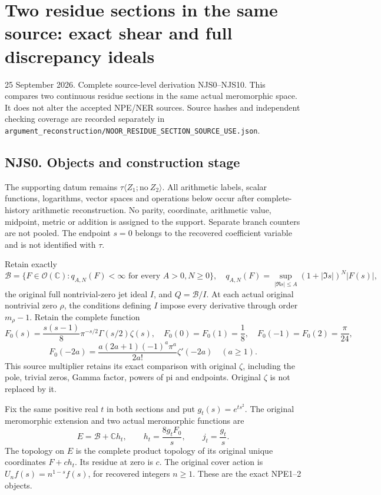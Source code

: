 \section{Two residue sections in the same source: exact shear and full
discrepancy
ideals}\label{two-residue-sections-in-the-same-source-exact-shear-and-full-discrepancy-ideals}

25 September 2026. Complete source-level derivation NJS0--NJS10. This
compares two continuous residue sections in the same actual meromorphic
space. It does not alter the accepted NPE/NER sources. Source hashes and
independent checking coverage are recorded separately in
\nolinkurl{argument_reconstruction/NOOR_RESIDUE_SECTION_SOURCE_USE.json}.

\subsection{NJS0. Objects and construction
stage}\label{njs0.-objects-and-construction-stage}

The supporting datum remains
\(\tau\langle Z_1;\mathrm{no}\ Z_2\rangle\). All arithmetic labels,
scalar functions, logarithms, vector spaces and operations below occur
after complete-history arithmetic reconstruction. No parity, coordinate,
arithmetic value, midpoint, metric or addition is assigned to the
support. Separate branch counters are not pooled. The endpoint \(s=0\)
belongs to the recovered coefficient variable and is not identified with
\(\tau\).

Retain exactly \[
\mathcal B=\{F\in\mathcal O(\mathbb C):q_{A,N}(F)<\infty\text{ for every }A>0,N\ge0\},
\quad q_{A,N}(F)=\sup_{|\Re s|\le A}(1+|\Im s|)^N|F(s)|,
\tag{NJS0.1}
\] the original full nontrivial-zero jet ideal \(I\), and
\(Q=\mathcal B/I\). At each actual original nontrivial zero \(\rho\),
the conditions defining \(I\) impose every derivative through order
\(m_\rho-1\). Retain the complete function \[
F_0(s)=\frac{s(s-1)}8\pi^{-s/2}\Gamma(s/2)\zeta(s),
\quad F_0(0)=F_0(1)=\frac18,
\quad F_0(-1)=F_0(2)=\frac\pi{24},
\] \[
F_0(-2a)=\frac{a(2a+1)(-1)^a\pi^a}{2a!}\zeta'(-2a)\quad(a\ge1).
\tag{NJS0.2}
\] This source multiplier retains its exact comparison with original
\(\zeta\), including the pole, trivial zeros, Gamma factor, powers of pi
and endpoints. Original \(\zeta\) is not replaced by it.

Fix the same positive real \(t\) in both sections and put
\(g_t(s)=e^{ts^2}\). The original meromorphic extension and two actual
meromorphic functions are \[
E=\mathcal B+\mathbb C h_t,
\qquad h_t=\frac{8g_tF_0}s,
\qquad j_t=\frac{g_t}s.
\tag{NJS0.3}
\] The topology on \(E\) is the complete product topology of its
original unique coordinates \(F+ch_t\). Its residue at zero is \(c\).
The original cover action is \(U_nf(s)=n^{1-s}f(s)\), for recovered
integers \(n\ge1\). These are the exact NPE1--2 objects.

